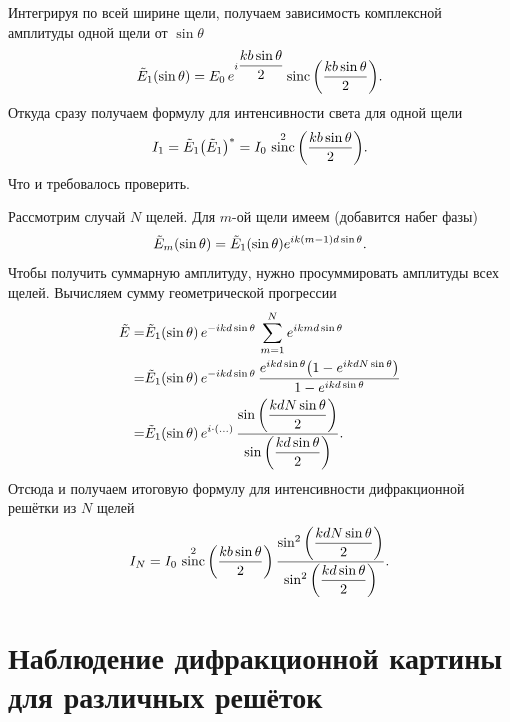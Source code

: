 \documentclass[12pt]{article}
\DeclareMathOperator\sinc{sinc}
\begin{document}
	Интегрируя по всей ширине щели, получаем зависимость комплексной амплитуды одной щели от $\sin{\theta}$
	\begin{equation}
		\tilde{E}_1\qty(\sin{\theta}) = E_0\, e^{i\dfrac{kb\sin{\theta}}{2}} \sinc\qty(\dfrac{kb\sin{\theta}}{2}).
	\end{equation}
	Откуда сразу получаем формулу для интенсивности света для одной щели
	\begin{equation}
		I_1 = \tilde{E}_1 \qty(\tilde{E}_1)^* = I_0\, \sinc^2\qty(\dfrac{kb\sin{\theta}}{2}).
	\end{equation}
	Что и требовалось проверить. 
	\par Рассмотрим случай $N$ щелей. Для $m$\--ой щели имеем (добавится набег фазы)
	\begin{equation}
		\tilde{E}_m\qty(\sin{\theta}) = \tilde{E}_1\qty(\sin{\theta}) e^{ik(m-1)d\sin{\theta}}.
	\end{equation}
	Чтобы получить суммарную амплитуду, нужно просуммировать амплитуды всех щелей. Вычисляем сумму геометрической прогрессии
	\begin{equation}
	\begin{split}
		\tilde{E} =& \tilde{E}_1\qty(\sin{\theta})\, e^{-ikd\sin{\theta}}\, \sum_{m=1}^{N} e^{ikmd\sin{\theta}}\\
		=&\tilde{E}_1\qty(\sin{\theta})\, e^{-ikd\sin{\theta}}\, \dfrac{e^{ikd\sin{\theta}}\qty(1 - e^{ikdN\sin{\theta}})}{1-e^{ikd\sin{\theta}}}\\
		=&\tilde{E}_1\qty(\sin{\theta})\, e^{i\cdot (...)}\, \dfrac{\sin\qty(\dfrac{kdN\sin{\theta}}{2})}{\sin\qty(\dfrac{kd\sin{\theta}}{2})}.
	\end{split}
	\end{equation}
	Отсюда и получаем итоговую формулу для интенсивности дифракционной решётки из $N$ щелей
	\begin{equation}
		I_N =  I_0\, \sinc^2\qty(\dfrac{kb\sin{\theta}}{2})\, \dfrac{\sin^2\qty(\dfrac{kdN\sin{\theta}}{2})}{\sin^2\qty(\dfrac{kd\sin{\theta}}{2})}.
	\end{equation}

	\section{Наблюдение дифракционной картины для различных решёток}
\end{document}

